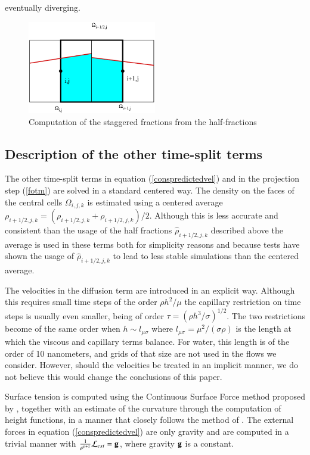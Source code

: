 eventually diverging.
\begin{figure}
\begin{center}
    \includegraphics[width=0.5\textwidth]{Figures/halffractions.pdf}
\end{center}
\caption{Computation of the staggered fractions from the half-fractions}
\label{halffractions}
\end{figure}
\clearpage

\subsection{Description of the other time-split terms}

The other time-split terms in equation (\ref{conspredictedvel}) and in the projection
step (\ref{fotm}) are solved in a standard centered way. The density on the faces
of the central cells $\Omega_{i,j,k}$ is estimated using a centered average
$\rho_{i+1/2,j,k} = (\rho_{i+1/2,j,k} + \rho_{i+1/2,j,k})/2$. Although this is less accurate and consistent
than the usage of the half fractions $\hat \rho_{i+1/2,j,k}$ described above the average 
is used in these terms both for simplicity reasons and because tests have shown the usage
of $\hat \rho_{i+1/2,j,k}$ to lead to less stable simulations than the centered average. 

The velocities in the diffusion term are introduced in an explicit way. Although this requires small
time steps of the order $\rho h^2/\mu$ the capillary restriction on time steps
is usually even smaller, being of order $\tau = (\rho h^3/\sigma)^{1/2}$. The two restrictions
become of the same order when $h \sim l_{\mu \sigma}$ where $l_{\mu \sigma} = \mu^2 / (\sigma \rho)$ 
is the length at which the viscous and capillary terms balance. For water, this length is 
of the order of 10 nanometers, and grids of that size are not used in the flows we consider. 
However, should the velocities be treated in an implicit manner, we do not believe this would
change the conclusions of this paper. 

Surface tension is computed using the Continuous Surface Force method proposed by 
\cite{brackbill92}, together with an estimate of the curvature through the computation
of height functions, in a manner that closely follows the method of \cite{popinet09}. 
The external forces in equation (\ref{conspredictedvel}) 
are only gravity and are computed in a trivial manner with 
$\frac 1 {\rho^{n+1}} {\cal L}_{ext} =  {\bf g}$, where gravity ${\bf g}$  is a constant. 


